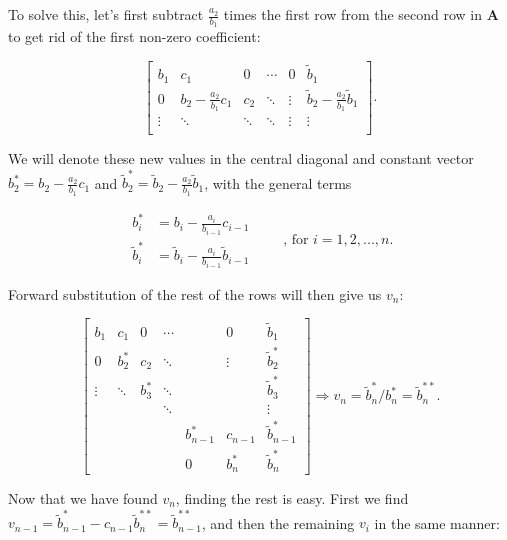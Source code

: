 \documentclass[]{article}
\begin{document}
To solve this, let's first subtract $\frac{a_2}{b_1}$ times the first row from the second row in $\mathbf{A}$ to get rid of the first non-zero coefficient:


\begin{equation*}
\left[ \begin{array} {ccccc|c}
b_1 & c_1 & 0 & \cdots & 0 & \tilde{b}_1\\
0 & b_2 - \frac{a_2}{b_1}c_1 & c_2 & \ddots & \vdots & \tilde{b}_2 -\frac{a_2}{b_1}\tilde{b}_1 \\
\vdots & \ddots & \ddots & \ddots & \vdots & \vdots \\
\end{array} \right].
\end{equation*}

We will denote these new values in the central diagonal and constant vector $b_{2}^{\ast} = b_2 - \frac{a_2}{b_1}c_1$ and $\tilde{b}_{2}^{\ast} = \tilde{b}_2 - \frac{a_2}{b_1}\tilde{b}_1$, with the general terms

\begin{equation*}
\begin{aligned}
b_{i}^{\ast} &= b_i - \frac{a_i}{b_{i-1}}c_{i-1} \\
\tilde{b}_{i}^{\ast} &= \tilde{b}_i - \frac{a_i}{b_{i-1}}\tilde{b}_{i-1}
\end{aligned}
\qquad \text{, for } i = 1,2,...,n \text{.}
\end{equation*}

Forward substitution of the rest of the rows will then give us $v_n$:

\begin{equation*}
\left[ \begin{array} {cccccc|c}
b_1 & c_1 & 0 & \cdots & & 0 & \tilde{b}_1\\
0 & b_{2}^{\ast} & c_2 & \ddots & & \vdots & \tilde{b}_{2}^{\ast} \\
\vdots & \ddots & b_{3}^{\ast} & \ddots & & & \tilde{b}_{3}^{\ast} \\
& & & \ddots & & & \vdots \\
& & & & b_{n-1}^{\ast} & c_{n-1} & \tilde{b}_{n-1}^{\ast} \\
& & & & 0 & b_{n}^{\ast} & \tilde{b}_{n}^{\ast}
\end{array} \right]
\Rightarrow v_n = \tilde{b}_{n}^{\ast} / b_{n}^{\ast} = \tilde{b}_{n}^{\ast\ast}.
\end{equation*}

Now that we have found $v_n$, finding the rest is easy. First we find $v_{n-1} = \tilde{b}_{n-1}^{\ast} - c_{n-1}\tilde{b}_{n}^{\ast\ast} = \tilde{b}_{n-1}^{\ast\ast}$, and then the remaining $v_i$ in the same manner:
\end{document}
